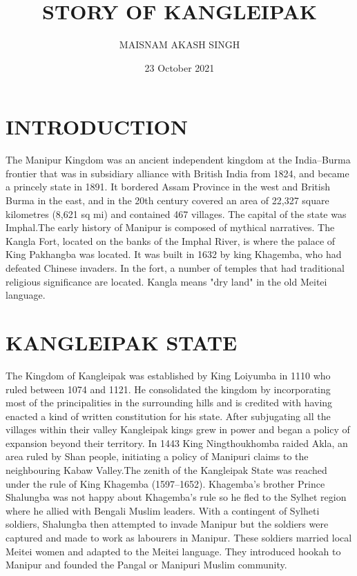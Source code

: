 \documentclass[10pt,a4 paper,two column]{article}
\title{STORY OF KANGLEIPAK}
\author{MAISNAM AKASH SINGH}
\date{23 October 2021}
\begin{document}
\maketitle
\section{INTRODUCTION}
The Manipur Kingdom was an ancient independent kingdom at the India–Burma frontier that was in subsidiary alliance with British India from 1824, and became a princely state in 1891. It bordered Assam Province in the west and British Burma in the east, and in the 20th century covered an area of 22,327 square kilometres (8,621 sq mi) and contained 467 villages. The capital of the state was Imphal.The early history of Manipur is composed of mythical narratives. The Kangla Fort, located on the banks of the Imphal River, is where the palace of King Pakhangba was located. It was built in 1632 by king Khagemba, who had defeated Chinese invaders. In the fort, a number of temples that had traditional religious significance are located. Kangla means "dry land" in the old Meitei language.\\
\section{KANGLEIPAK STATE}
The Kingdom of Kangleipak was established by King Loiyumba in 1110 who ruled between 1074 and 1121. He consolidated the kingdom by incorporating most of the principalities in the surrounding hills and is credited with having enacted a kind of written constitution for his state. After subjugating all the villages within their valley Kangleipak kings grew in power and began a policy of expansion beyond their territory. In 1443 King Ningthoukhomba raided Akla, an area ruled by Shan people, initiating a policy of Manipuri claims to the neighbouring Kabaw Valley.The zenith of the Kangleipak State was reached under the rule of King Khagemba (1597–1652). Khagemba's brother Prince Shalungba was not happy about Khagemba's rule so he fled to the Sylhet region where he allied with Bengali Muslim leaders. With a contingent of Sylheti soldiers, Shalungba then attempted to invade Manipur but the soldiers were captured and made to work as labourers in Manipur. These soldiers married local Meitei women and adapted to the Meitei language. They introduced hookah to Manipur and founded the Pangal or Manipuri Muslim community.
\end{document}
